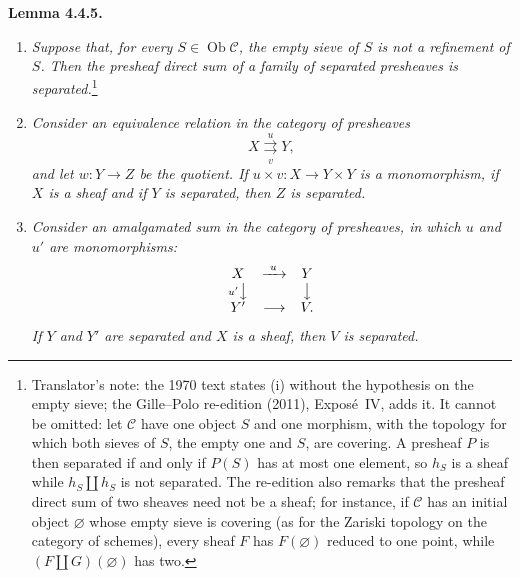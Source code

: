 

\medskip
\noindent{}\textbf{Lemma 4.4.5.}
\begin{enumerate}
  \item[(i)] \textit{Suppose that, for every
    \(S\in\operatorname{Ob}\mathscr C\), the empty sieve of \(S\) is not a
    refinement of \(S\). Then the presheaf direct sum of a family of
    separated presheaves is separated.}\footnote{Translator's note: the 1970 text states (i) without the
hypothesis on the empty sieve; the Gille--Polo re-edition (2011), Expos\'e~IV,
adds it. It cannot be omitted: let \(\mathscr C\) have one object \(S\) and
one morphism, with the topology for which both sieves of \(S\), the empty one
and \(S\), are covering. A presheaf \(P\) is then separated if and only if
\(P(S)\) has at most one element, so \(h_S\) is a sheaf while
\(h_S\amalg h_S\) is not separated. The re-edition also remarks that the
presheaf direct sum of two sheaves need not be a sheaf; for instance, if
\(\mathscr C\) has an initial object \(\varnothing\) whose empty sieve is
covering (as for the Zariski topology on the category of schemes), every sheaf
\(F\) has \(F(\varnothing)\) reduced to one point, while
\((F\amalg G)(\varnothing)\) has two.}

  \item[(ii)] \textit{Consider an equivalence relation in the category of
    presheaves}
    \[
      X\overset{u}{\underset{v}{\rightrightarrows}}Y,
    \]
    \textit{and let \(w:Y\to Z\) be the quotient. If
    \(u\times v:X\to Y\times Y\) is a monomorphism, if \(X\) is a sheaf and if
    \(Y\) is separated, then \(Z\) is separated.}

  \item[(iii)] \textit{Consider an amalgamated sum in the category of
    presheaves, in which \(u\) and \(u'\) are monomorphisms:}
    \[
    \begin{array}{ccc}
      X & \xrightarrow{\ u\ } & Y\\
      {\scriptstyle u'}\big\downarrow && \big\downarrow\\
      Y' & \longrightarrow & V.
    \end{array}
    \]
    \textit{If \(Y\) and \(Y'\) are separated and \(X\) is a sheaf, then
    \(V\) is separated.}
\end{enumerate}

